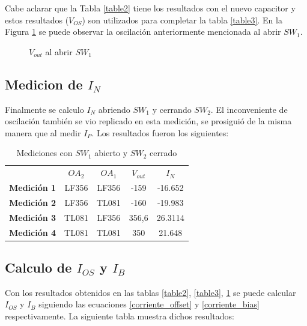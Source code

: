 Cabe aclarar que la Tabla \ref{table2} tiene los resultados con el nuevo capacitor y estos resultados ($V_{OS}$) son utilizados para completar la tabla \ref{table3}. 
En la Figura \ref{medicion} se puede observar la oscilación anteriormente mencionada al abrir $SW_1$. 

\begin{figure}[h!]                                                       
     \caption{$V_{out}$ al abrir $SW_1$}
     \label{medicion}
     \end{figure}

\subsection{Medicion de $I_{N}$}


Finalmente se calculo $I_N$ abriendo $SW_1$ y cerrando $SW_2$. El inconveniente de oscilación también se vio replicado en esta medición, se prosiguió de la misma manera que al medir $I_P$.  
Los resultados fueron los siguientes:

\begin{table}[ht]
    \centering
    \caption{Mediciones con $SW_1$ abierto y $SW_2$ cerrado}
    \label{table4}
    \begin{tabular}{@{}ccccc@{}}
    \textbf{}           & \textbf{$OA_2$} & \textbf{$OA_1$} & \textbf{$V_{out}$} & \textbf{$I_N$} \\ 
    \textbf{Medición 1} & LF356          & LF356          & -159              &  -16.652            \\
    \textbf{Medición 2} & LF356          & TL081          & -160              &  -19.983            \\
    \textbf{Medición 3} & TL081          & LF356          & 356,6              &  26.3114            \\
    \textbf{Medición 4} & TL081          & TL081          & 350              &  21.648            \\ 
    \end{tabular}
\end{table}


\subsection{Calculo de $I_{OS}$ y $I_B$}

Con los resultados obtenidos en las tablas \ref{table2}, \ref{table3}, \ref{table4} se puede calcular $I_{OS}$ y $I_B$ siguiendo las ecuaciones \ref{corriente_offset} y \ref{corriente_bias} respectivamente. La siguiente tabla muestra dichos resultados:


